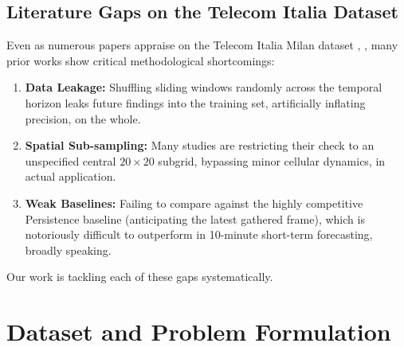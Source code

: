 \documentclass[conference]{IEEEtran}
\begin{document}
\subsection{Literature Gaps on the Telecom Italia Dataset}
Even as numerous papers appraise on the Telecom Italia Milan dataset \cite{b11}, \cite{b12}, many prior works show critical methodological shortcomings:
\begin{enumerate}
    \item \textbf{Data Leakage:} Shuffling sliding windows randomly across the temporal horizon leaks future findings into the training set, artificially inflating precision, on the whole.
    \item \textbf{Spatial Sub-sampling:} Many studies are restricting their check to an unspecified central $20 \times 20$ subgrid, bypassing minor cellular dynamics, in actual application.
    \item \textbf{Weak Baselines:} Failing to compare against the highly competitive Persistence baseline (anticipating the latest gathered frame), which is notoriously difficult to outperform in 10-minute short-term forecasting, broadly speaking.
\end{enumerate}
Our work is tackling each of these gaps systematically.

\section{Dataset and Problem Formulation}
\end{document}
